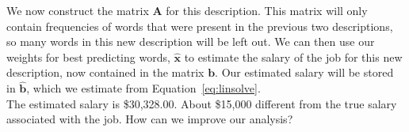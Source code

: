 \documentclass[12pt]{article}
\begin{document}
    We now construct the matrix $\bm{A}$ for this description. This matrix will
    only contain frequencies of words that were present in the previous two
    descriptions, so many words in this new description will be left out. We
    can then use our weights for best predicting words, $\bm{\hat{x}}$ to
    estimate the salary of the job for this new description, now contained in
    the matrix $\bm{b}$. Our estimated salary will be stored in $\bm{\hat{b}}$,
    which we estimate from Equation~\ref{eq:linsolve}. \\

    The estimated salary is \$30,328.00. About \$15,000 different from the true
    salary associated with the job. How can we improve our analysis?
\end{document}
